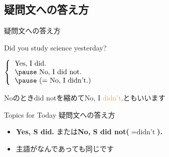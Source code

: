 \documentclass[aspectratio=169,xcolor={dvipsnames,table}]{beamer}
\newcommand{\myaudio}[1]{\href{#1}{\faVolumeUp}}
\begin{document}
\subsection{疑問文への答え方}
 \begin{frame}[plain]{疑問文への答え方}
 \Large
\pause

Did  you study science yesterday?

\vspace{20pt}
\pause

\mbox{}\hspace{100pt}$\left\{\begin{tabular}{l}
         \text{Yes, I did.}\\\pause
         \text{No, I did not.}\\\pause
         \text{(}= \text{No, I didn't.)}
        \end{tabular}\right.$

\pause

\mbox{}\hfill{}{\small Noのときdid notを縮めてNo, I \textcolor{orange}{didn't}.ともいいます}\,\,\myaudio{./audio/027_past_did_you_03.mp3}

\begin{exampleblock}{Topics for Today}
\small
疑問文への答え方
\begin{itemize}
 \item  \textcolor{NavyBlue}{\bfseries Yes, S did.} または\textcolor{NavyBlue}{\bfseries No, S did not($=\text{didn't}$).}
 \item  主語がなんであっても同じです
\end{itemize}
      \end{exampleblock}

\end{frame}
\end{document}
